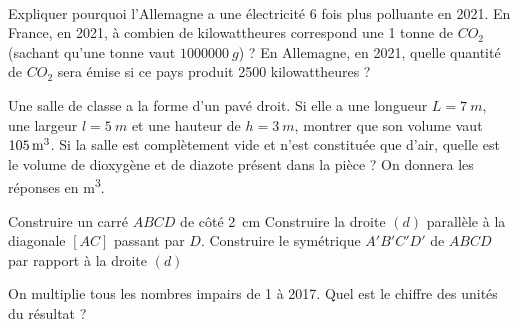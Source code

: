 \documentclass[../Cours.tex]{subfiles}
\begin{document}
\begin{questions}
    \\

    \question Expliquer pourquoi l'Allemagne a une électricité 6 fois plus polluante en 2021.
    \question En France, en 2021, à combien de kilowattheures correspond une 1 tonne de $CO_2$ (sachant qu'une tonne vaut $\qty{1000000}{g}$) ?
    \question En Allemagne, en 2021, quelle quantité de $CO_2$ sera émise si ce pays produit \num{2500} kilowattheures ?

    \clearpage

    \question Une salle de classe a la forme d'un pavé droit. Si elle a une longueur $L=\qty{7}{m}$, une largeur $l=\qty{5}{m}$ et une hauteur de $h=\qty{3}{m}$, montrer que son volume vaut $\qty{105}{m\cubed}$.
    \question Si la salle est complètement vide et n'est constituée que d'air, quelle est le volume de dioxygène et de diazote présent dans la pièce ? On donnera les réponses en \unit{\metre\cubed}.


    \question Construire un carré $ABCD$ de côté \qty{2}{\centi\metre}
    \question Construire la droite $(d)$ parallèle à la diagonale $[AC]$ passant par $D$.
    \question Construire le symétrique $A'B'C'D'$ de $ABCD$ par rapport à la droite $(d)$



    \question On multiplie tous les nombres impairs de 1 à 2017. Quel est le chiffre des unités du résultat ?

    
    
\end{questions}
\end{document}
